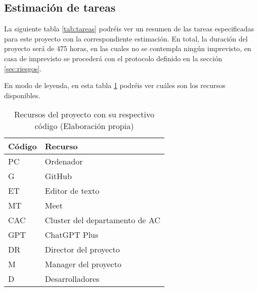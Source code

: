 \subsection{Estimación de tareas}
\label{sec:estimacion_tareas}


La siguiente tabla \ref{tab:tareas} podréis ver un resumen de las tareas especificadas
para este proyecto con la correspondiente estimación. En total, la duración del proyecto
será de 475 horas, en las cuales no se contempla ningún imprevisto, en casa de imprevisto
se procederá con el protocolo definido en la sección \ref{sec:riesgos}.

En modo de leyenda, en esta tabla \ref{tab:recursos} podréis ver cuáles son los recursos disponibles.

\begin{table}[H]
    \centering
    \begin{tabular}{|l|l|}
    \hline
    \rowcolor[HTML]{8EA9D8} 
    Código & Recurso                        \\ \hline
    PC     & Ordenador                      \\ \hline
    G      & GitHub                         \\ \hline
    ET     & Editor de texto                \\ \hline
    MT     & Meet                           \\ \hline
    CAC    & Cluster del departamento de AC \\ \hline
    GPT    & ChatGPT Plus                   \\ \hline
    DR     & Director del proyecto          \\ \hline
    M      & Manager del proyecto           \\ \hline
    D      & Desarrolladores                \\ \hline
    \end{tabular}
    \caption[Recursos del proyecto con su respectivo código]{Recursos del proyecto con su respectivo código (Elaboración propia)}
    \label{tab:recursos}
\end{table}

